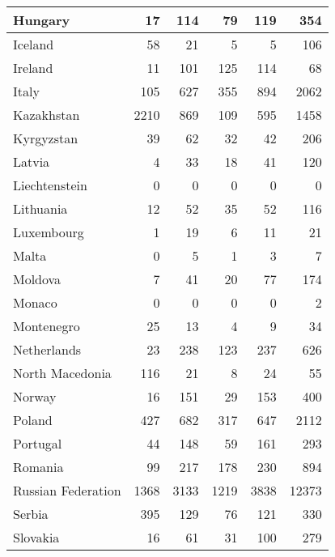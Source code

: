 \begin{table}
\begin{center}
\begin{tabular}{|l|r|r|r|r|r|}
                       Hungary&    17&   114&    79&   119&   354 \\\hline
                       Iceland&    58&    21&     5&     5&   106 \\\hline
                       Ireland&    11&   101&   125&   114&    68 \\\hline
                         Italy&   105&   627&   355&   894&  2062 \\\hline
                    Kazakhstan&  2210&   869&   109&   595&  1458 \\\hline
                    Kyrgyzstan&    39&    62&    32&    42&   206 \\\hline
                        Latvia&     4&    33&    18&    41&   120 \\\hline
                 Liechtenstein&     0&     0&     0&     0&     0 \\\hline
                     Lithuania&    12&    52&    35&    52&   116 \\\hline
                    Luxembourg&     1&    19&     6&    11&    21 \\\hline
                         Malta&     0&     5&     1&     3&     7 \\\hline
                       Moldova&     7&    41&    20&    77&   174 \\\hline
                        Monaco&     0&     0&     0&     0&     2 \\\hline
                    Montenegro&    25&    13&     4&     9&    34 \\\hline
                   Netherlands&    23&   238&   123&   237&   626 \\\hline
               North Macedonia&   116&    21&     8&    24&    55 \\\hline
                        Norway&    16&   151&    29&   153&   400 \\\hline
                        Poland&   427&   682&   317&   647&  2112 \\\hline
                      Portugal&    44&   148&    59&   161&   293 \\\hline
                       Romania&    99&   217&   178&   230&   894 \\\hline
            Russian Federation&  1368&  3133&  1219&  3838& 12373 \\\hline
                        Serbia&   395&   129&    76&   121&   330 \\\hline
                      Slovakia&    16&    61&    31&   100&   279 \\\hline

\end{tabular}
\end{center}
\end{table}
